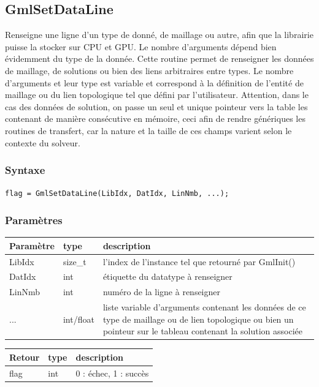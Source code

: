 \documentclass[a4paper,12pt]{article}
\begin{document}
\subsection{GmlSetDataLine}

Renseigne une ligne d'un type de donné, de maillage ou autre, afin que la librairie puisse la stocker sur CPU et GPU.
Le nombre d'arguments dépend bien évidemment du type de la donnée.
Cette routine permet de renseigner les données de maillage, de solutions ou bien des liens arbitraires entre types.
Le nombre d'arguments et leur type est variable et correspond à la définition de l'entité de maillage ou du lien topologique tel que défini par l'utilisateur.
Attention, dans le cas des données de solution, on passe un seul et unique pointeur vers la table les contenant de manière consécutive en mémoire, ceci afin de rendre génériques les routines de transfert, car la nature et la taille de ces champs varient selon le contexte du solveur.

\subsubsection*{Syntaxe}

{\tt flag = GmlSetDataLine(LibIdx, DatIdx, LinNmb, ...);}

\subsubsection*{Paramètres}

\begin{tabular}{|m{2cm}|m{1.5cm}|m{10.5cm}|}
\hline
Paramètre  & type      & description \\
\hline
LibIdx     & size\_t   & l'index de l'instance tel que retourné par GmlInit() \\
\hline
DatIdx     & int       & étiquette du datatype à renseigner \\
\hline
LinNmb     & int       & numéro de la ligne à renseigner \\
\hline
...        & int/float & liste variable d'arguments contenant les données de ce type de maillage ou de lien topologique ou bien un pointeur sur le tableau contenant la solution associée \\
\hline
\end{tabular}

\medskip

\begin{tabular}{|m{2cm}|m{1.5cm}|m{10.5cm}|}
\hline
Retour     & type   & description \\
\hline
flag       & int    & 0 : échec, 1 : succès \\
\hline
\end{tabular}
\end{document}
